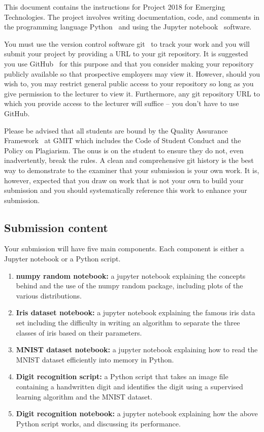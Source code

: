 \documentclass[12pt, a4paper]{article}
\title{\projectname}
\author{\modulename}
\date{Due: \duedate}
\newcommand{\modulename}{Emerging Technologies}
\newcommand{\projectyear}{2018}
\newcommand{\projectname}{Project \projectyear}
\begin{document}
\maketitle

\noindent
This document contains the instructions for \projectname{} for \modulename{}.
The project involves writing documentation, code, and comments in the programming language Python~\cite{python} and using the Jupyter notebook~\cite{jupyter} software.

You must use the version control software git~\cite{git} to track your work and you will submit your project by providing a URL to your git repository.
It is suggested you use GitHub~\cite{github} for this purpose and that you consider making your repository publicly available so that prospective employers may view it.
However, should you wish to, you may restrict general public access to your repository so long as you give permission to the lecturer to view it.
Furthermore, any git repository URL to which you provide access to the lecturer will suffice -- you don't have to use GitHub.

Please be advised that all students are bound by the Quality Assurance Framework~\cite{gmitqaf} at GMIT which includes the Code of Student Conduct and the Policy on Plagiarism.
The onus is on the student to ensure they do not, even inadvertently, break the rules.
A clean and comprehensive git history is the best way to demonstrate to the examiner that your submission is your own work.
It is, however, expected that you draw on work that is not your own to build your submission and you should systematically reference this work to enhance your submission.

\subsection*{Submission content}
Your submission will have five main components.
Each component is either a Jupyter notebook or a Python script.

\begin{enumerate}
  \item \textbf{numpy random notebook:} a jupyter notebook explaining the concepts behind and the use of the numpy random package, including plots of the various distributions.
  \item \textbf{Iris dataset notebook:} a jupyter notebook explaining the famous iris data set including the difficulty in writing an algorithm to separate the three classes of iris based on their parameters.
  \item \textbf{MNIST dataset notebook:} a jupyter notebook explaining how to read the MNIST dataset efficiently into memory in Python.
  \item \textbf{Digit recognition script:} a Python script that takes an image file containing a handwritten digit and identifies the digit using a supervised learning algorithm and the MNIST dataset.
  \item \textbf{Digit recognition notebook:} a jupyter notebook explaining how the above Python script works, and discussing its performance.
\end{enumerate}
\end{document}

